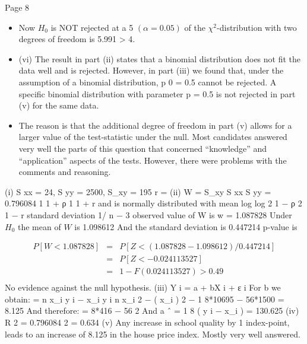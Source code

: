 \documentclass[a4paper,12pt]{article}
\begin{document}
Page 8%
\begin{itemize}
\item Now $H_{0}$ is NOT rejected at a 5%
$(\alpha = 0.05)$ of the $\chi^2$-distribution with two degrees of freedom is
5.991 > 4.
\item (vi)
The result in part (ii) states that a binomial distribution does not fit the data
well and is rejected. However, in part (iii) we found that, under the assumption
of a binomial distribution, p 0 = 0.5 cannot be rejected. A specific binomial
distribution with parameter p = 0.5 is not rejected in part (v) for the same
data. 
\item The reason is that the additional degree of freedom in part (v) allows for
a larger value of the test-statistic under the null.
Most candidates answered very well the parts of this question that concerned “knowledge”
and “application” aspects of the tests. However, there were problems with the comments and
reasoning.
\end{itemize}
\newpage
(i)
S xx = 24, S yy = 2500, S_{xy} = 195
r =
(ii)
W =
S_{xy}
S xx S yy
= 0.796084
1
1 + ρ
1
1 + r
and
is normally distributed with mean log
log
2
1 − ρ
2
1 − r
standard deviation 1/ n − 3
observed value of W is w = 1.087828
Under $H_{0}$ the mean of $W$ is 1.098612
And the standard deviation is 0.447214
p-value is 

\begin{eqnarray*}
P [ W < 1.087828 ] &=& P [ Z < ( 1.087828 − 1.098612) / 0.447214]\\
&=& P [ Z < − 0.024113527 ] \\ &=& 1 − F (0.024113527) > 0.49\\
\end{eqnarray*}
No evidence against the null hypothesis.
(iii)
Y i = a + bX i + ε i
{
For b we obtain:  = n \sum x_i y i −
\sum x_i \sum y i } { n \sum x_i 2 − ( \sum x_i ) 2 }
− 1
8*10695 − 56*1500
= 8.125
And therefore:  =
8*416 − 56 2
And a ˆ =
1
8
( \sum y i −  \sum x_i ) = 130.625
(iv) R 2 = 0.796084 2 = 0.634
(v) Any increase in school quality by 1 index-point, leads to an increase of 8.125
in the house price index.
Mostly very well answered.
\end{document}
